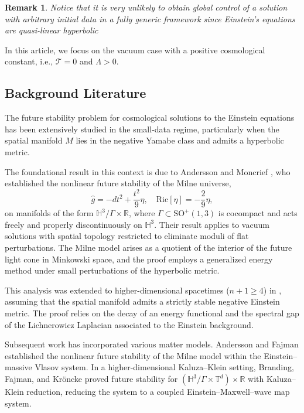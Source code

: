 \documentclass{amsart}
\newtheorem{remark}{Remark}
\begin{document}
\begin{remark}
 Notice that it is very unlikely to obtain global control of a solution with arbitrary initial data in a fully generic framework since Einstein's equations are quasi-linear  \textit{hyperbolic}  
\end{remark}

\noindent In this article, we focus on the vacuum case with a positive cosmological constant, i.e., $\mathcal{T}=0$ and $\Lambda>0$.
\subsection{Background Literature}

\noindent The future stability problem for cosmological solutions to the Einstein equations has been extensively studied in the small-data regime, particularly when the spatial manifold $M$ lies in the negative Yamabe class and admits a hyperbolic metric.

\noindent The foundational result in this context is due to Andersson and Moncrief \cite{andersson2004future}, who established the nonlinear future stability of the Milne universe,
\[
\widehat{g} = -dt^2 + \frac{t^2}{9}\eta, \quad \text{Ric}[\eta] = -\frac{2}{9}\eta,
\]
on manifolds of the form $\mathbb{H}^3/\Gamma \times \mathbb{R}$, where $\Gamma \subset \mathrm{SO}^{+}(1,3)$ is cocompact and acts freely and properly discontinuously on $\mathbb{H}^3$. Their result applies to vacuum solutions with spatial topology restricted to eliminate moduli of flat perturbations. The Milne model arises as a quotient of the interior of the future light cone in Minkowski space, and the proof employs a generalized energy method under small perturbations of the hyperbolic metric.

\noindent This analysis was extended to higher-dimensional spacetimes ($n+1 \geq 4$) in \cite{andersson2011einstein}, assuming that the spatial manifold admits a strictly stable negative Einstein metric. The proof relies on the decay of an energy functional and the spectral gap of the Lichnerowicz Laplacian associated to the Einstein background.

\noindent Subsequent work has incorporated various matter models. Andersson and Fajman \cite{andersson2020nonlinear} established the nonlinear future stability of the Milne model within the Einstein–massive Vlasov system. In a higher-dimensional Kaluza–Klein setting, Branding, Fajman, and Kröncke \cite{KK} proved future stability for $(\mathbb{H}^3/\Gamma \times \mathbb{T}^d) \times \mathbb{R}$ with Kaluza–Klein reduction, reducing the system to a coupled Einstein–Maxwell–wave map system.
\end{document}
